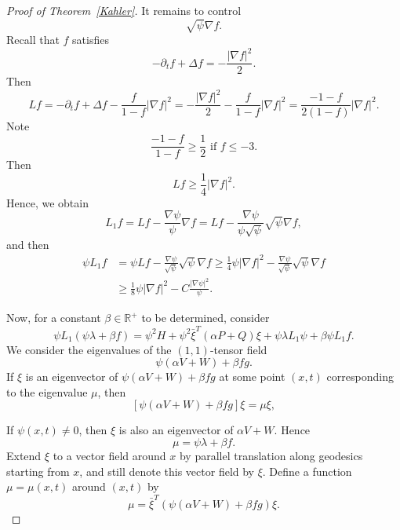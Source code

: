 \documentclass{amsart}
\theoremstyle{definition}
\theoremstyle{remark}
\numberwithin{equation}{section}
\begin{document}
\begin{proof}[Proof of Theorem~\ref{Kahler}]
It remains to control
\[
\sqrt{\psi} \nabla f.
\]
Recall that $f$ satisfies
\[
-\partial_t f+\Delta f=-\frac{|\nabla f|^2}{2}.
\]
Then
\[
L f=-\partial_t f+\Delta f-\frac{f}{1-f}|\nabla f|^2=-\frac{|\nabla f|^2}{2}-\frac{f}{1-f}|\nabla f|^2=\frac{-1-f}{2(1-f)}|\nabla f|^2.
\]
Note
\[
\frac{-1-f}{1-f} \geq \frac{1}{2} \text { if } f \leq-3 .
\]
Then
\[
L f \geq \frac{1}{4}|\nabla f|^2 .
\]
Hence, we obtain
\[
L_1 f=L f-\frac{\nabla \psi}{\psi} \nabla f=L f-\frac{\nabla \psi}{\psi\sqrt{\psi}} \sqrt{\psi} \nabla f,
\]
and then
  \begin{align}
    \psi L_1 f & =\psi L f-\frac{\nabla \psi}{\sqrt{\psi}} \sqrt{\psi} \nabla f \geq \frac{1}{4} \psi|\nabla f|^2- \frac{\nabla \psi}{\sqrt{\psi}} \sqrt{\psi} \nabla f \nonumber\\
    & \label{estimate of f}\geq \frac{1}{8} \psi|\nabla f|^2-C \frac{|\nabla \psi|^2}{\psi} .
    \end{align}


Now, for a constant $\beta \in \mathbb{R}^{+}$ to be determined, consider
\[
\psi L_1(\psi \lambda+\beta f)=\psi^2 H+\psi^2 \bar{\xi}^T(\alpha P+Q) \xi+\psi \lambda L_1 \psi+\beta \psi L_1 f .
\]
We consider the eigenvalues of the $(1,1)$-tensor field
\[
\psi(\alpha V+W)+\beta f g .
\]
If $\xi$ is an eigenvector of $\psi(\alpha V+W)+\beta f g$ at some point $(x, t)$ corresponding to the eigenvalue $\mu$, then
\[
[\psi(\alpha V+W)+\beta f g] \xi=\mu \xi,
\]

If $\psi(x, t) \neq 0$, then $\xi$ is also an eigenvector of $\alpha V+W$. Hence
\[
\mu=\psi \lambda+\beta f .
\]
Extend $\xi$ to a vector field around $x$ by parallel translation along geodesics starting from $x$, and still denote this vector field by $\xi$. Define a function $\mu=\mu(x, t)$ around $\left(x, t\right)$ by
\[
\mu=\bar{\xi}^T(\psi(\alpha V+W)+\beta f g) \xi .
\]


\end{proof}
\end{document}
